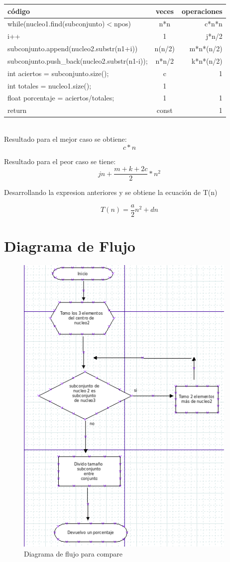 \documentclass[10pt,a4paper,spanish] {article}
\begin{document}
\begin{tabular}{|l|c|r|}
\hline
código & veces & operaciones\\
\hline
while(nucleo1.find(subconjunto)$<$npos)\ & n*n & c*n*n \\
i++ & 1 & j*n/2 \\
subconjunto.append(nucleo2.substr(n1+i)) & n(n/2) & m*n*(n/2)\\
subconjunto.push\_back(nucleo2.substr(n1-i));& n*n/2 & k*n*(n/2)\\
int aciertos = subconjunto.size(); & c & 1 \\
int totales  = nucleo1.size(); & 1 & \\
float porcentaje = aciertos/totales;  & 1 & 1 \\
return & const & 1\\
\hline
\end{tabular}
\\
\newline
Resultado para el mejor caso se obtiene: \\

\begin{equation}
\label{eq:best}
c*n
\end{equation}


Resultado para el peor caso se tiene:\\

\begin{equation}
\label{eq:worst}
jn + \frac{m+k+2c}{2}*n^2
\end{equation}

Desarrollando la expresion anteriores y se obtiene la ecuación de T(n)

\begin{equation}
\label{eq:T(n)}
T(n)=\frac{a}{2}n^2 + dn 
\end{equation}

\section{Diagrama de Flujo}
\begin{figure}[h]
\centering
 \includegraphics[width=3.0 in]{diagrama.png}
 \caption{Diagrama de flujo para compare}
 \label{flujo}

\end{figure}
\end{document}
